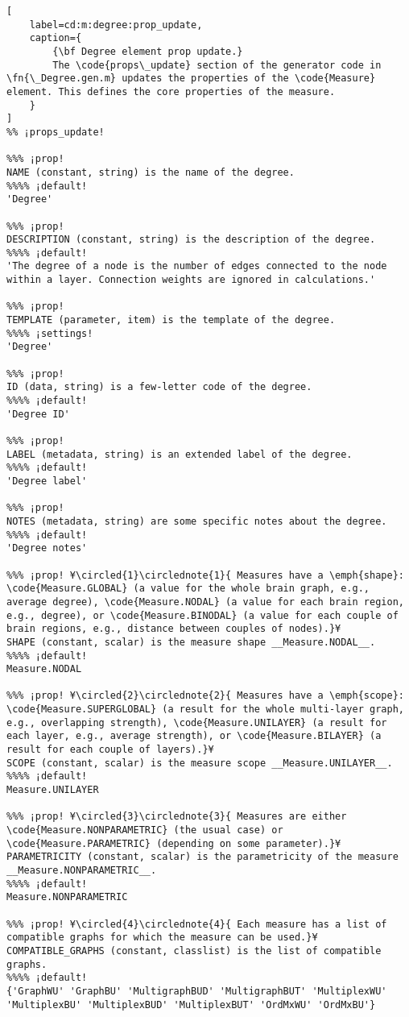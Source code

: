 \documentclass{tufte-handout}
\begin{document}
\begin{lstlisting}[
	label=cd:m:degree:prop_update,
	caption={
		{\bf Degree element prop update.}
		The \code{props\_update} section of the generator code in \fn{\_Degree.gen.m} updates the properties of the \code{Measure} element. This defines the core properties of the measure.
	}
]
%% ¡props_update!

%%% ¡prop!
NAME (constant, string) is the name of the degree.
%%%% ¡default!
'Degree'

%%% ¡prop!
DESCRIPTION (constant, string) is the description of the degree.
%%%% ¡default!
'The degree of a node is the number of edges connected to the node within a layer. Connection weights are ignored in calculations.'

%%% ¡prop!
TEMPLATE (parameter, item) is the template of the degree.
%%%% ¡settings!
'Degree'

%%% ¡prop!
ID (data, string) is a few-letter code of the degree.
%%%% ¡default!
'Degree ID'

%%% ¡prop!
LABEL (metadata, string) is an extended label of the degree.
%%%% ¡default!
'Degree label'

%%% ¡prop!
NOTES (metadata, string) are some specific notes about the degree.
%%%% ¡default!
'Degree notes'

%%% ¡prop! ¥\circled{1}\circlednote{1}{ Measures have a \emph{shape}: \code{Measure.GLOBAL} (a value for the whole brain graph, e.g., average degree), \code{Measure.NODAL} (a value for each brain region, e.g., degree), or \code{Measure.BINODAL} (a value for each couple of brain regions, e.g., distance between couples of nodes).}¥
SHAPE (constant, scalar) is the measure shape __Measure.NODAL__.
%%%% ¡default!
Measure.NODAL

%%% ¡prop! ¥\circled{2}\circlednote{2}{ Measures have a \emph{scope}: \code{Measure.SUPERGLOBAL} (a result for the whole multi-layer graph, e.g., overlapping strength), \code{Measure.UNILAYER} (a result for each layer, e.g., average strength), or \code{Measure.BILAYER} (a result for each couple of layers).}¥
SCOPE (constant, scalar) is the measure scope __Measure.UNILAYER__.
%%%% ¡default!
Measure.UNILAYER

%%% ¡prop! ¥\circled{3}\circlednote{3}{ Measures are either \code{Measure.NONPARAMETRIC} (the usual case) or \code{Measure.PARAMETRIC} (depending on some parameter).}¥
PARAMETRICITY (constant, scalar) is the parametricity of the measure __Measure.NONPARAMETRIC__.
%%%% ¡default!
Measure.NONPARAMETRIC

%%% ¡prop! ¥\circled{4}\circlednote{4}{ Each measure has a list of compatible graphs for which the measure can be used.}¥
COMPATIBLE_GRAPHS (constant, classlist) is the list of compatible graphs.
%%%% ¡default!
{'GraphWU' 'GraphBU' 'MultigraphBUD' 'MultigraphBUT' 'MultiplexWU' 'MultiplexBU' 'MultiplexBUD' 'MultiplexBUT' 'OrdMxWU' 'OrdMxBU'}


\end{lstlisting}
\end{document}
